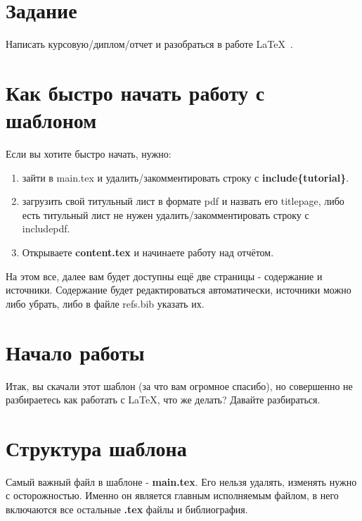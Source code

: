 
\section*{Задание}
Написать курсовую/диплом/отчет и разобраться в работе \LaTeX\ .

\section*{Как быстро начать работу с шаблоном}
Если вы хотите быстро начать, нужно: 
\begin{enumerate}
\item зайти в main.tex и удалить/закомментировать строку с \textbf{include\{tutorial\}}.
\item загрузить свой титульный лист в формате pdf и назвать его titlepage, либо есть титульный лист не нужен удалить/закомментировать строку с includepdf.
\item Открываете \textbf{content.tex} и начинаете работу над отчётом.
\end{enumerate}

На этом все, далее вам будет доступны ещё две страницы - содержание и источники. Содержание будет редактироваться автоматически, источники можно либо убрать, либо в файле refs.bib указать их.



\section*{Начало работы}

Итак, вы скачали этот шаблон (за что вам огромное спасибо), но совершенно не разбираетесь как работать с \LaTeX, что же делать? Давайте разбираться.


\section{Структура шаблона}
Самый важный файл в шаблоне - \textbf{main.tex}. Его нельзя удалять, изменять нужно с осторожностью. Именно он является главным исполняемым файлом, в него включаются все остальные \textbf{.tex }файлы и библиография.




